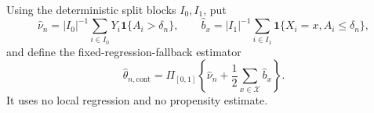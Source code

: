 Using the deterministic split blocks \(I_0,I_1\), put
\[
 \widehat\nu_n=|I_0|^{-1}\sum_{i\in I_0}Y_i\mathbf 1\{A_i>\delta_n\},
 \qquad
 \widehat b_x=|I_1|^{-1}\sum_{i\in I_1}\mathbf 1\{X_i=x,A_i\leq\delta_n\},
\]
and define the fixed-regression-fallback estimator
\[
 \widehat\theta_{n,\mathrm{cont}}
 =\Pi_{[0,1]}\left\{\widehat\nu_n+\frac12\sum_{x\in\mathcal X}\widehat b_x\right\}.
\]
It uses no local regression and no propensity estimate.